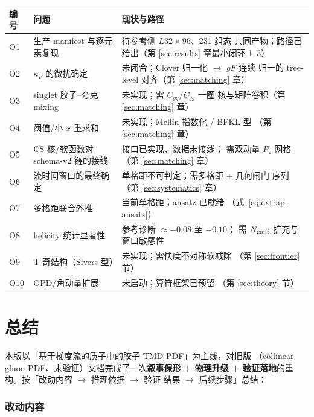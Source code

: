 \documentclass[11pt,a4paper]{ctexart}
\begin{document}
\begin{center}
\footnotesize
\begin{tabularx}{\textwidth}{@{}l l >{\raggedright\arraybackslash}X@{}}
\toprule
\textbf{编号} & \textbf{问题} & \textbf{现状与路径} \\
\midrule
O1 & 生产 manifest 与逐元素复现 & 待参考侧 $L32\times96$、231 组态
共同产物；路径已给出（第 \ref{sec:results} 章最小闭环 1--3） \\
O2 & $\kappa_F$ 的微扰确定 & 未闭合；Clover 归一化 $\to$ $gF$ 连续
归一的 tree-level 对齐（第 \ref{sec:matching} 章） \\
O3 & singlet 胶子--夸克 mixing & 未实现；需 $C_{gq}/C_{qg}$ 一圈
核与矩阵卷积（第 \ref{sec:matching} 章） \\
O4 & 阈值/小 $x$ 重求和 & 未实现；Mellin 指数化 / BFKL 型
（第 \ref{sec:matching} 章） \\
O5 & CS 核/软函数对 schema-v2 链的接线 & 接口已实现、数据未接线；
需双动量 $P_z$ 网格（第 \ref{sec:matching} 章） \\
O6 & 流时间窗口的最终确定 & 单格距不可判定；需多格距 + 几何闸门
序列（第 \ref{sec:systematics} 章） \\
O7 & 多格距联合外推 & 当前单格距；ansatz 已就绪
（式~\eqref{eq:extrap-ansatz}） \\
O8 & helicity 统计显著性 & 参考诊断 $\approx-0.08$ 至 $-0.10$；
需 $N_{\rm conf}$ 扩充与窗口敏感性 \\
O9 & T-奇结构（Sivers 型） & 未实现；需快度不对称软减除
（第 \ref{sec:frontier} 节） \\
O10 & GPD/角动量扩展 & 未启动；算符框架已预留
（第 \ref{sec:theory} 节） \\
\bottomrule
\end{tabularx}
\end{center}

\section{总结}
\label{sec:conclusion}

本版以「基于梯度流的质子中的胶子 TMD-PDF」为主线，对旧版
（collinear gluon PDF、未验证）文档完成了一次\textbf{叙事保形 +
物理升级 + 验证落地}的重构。按「改动内容 $\to$ 推理依据 $\to$ 验证
结果 $\to$ 后续步骤」总结：

\subsubsection{改动内容}
\end{document}
